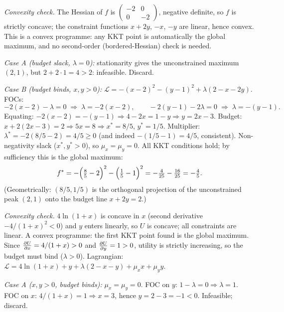 \begin{solutions}
  \item \emph{Convexity check.} The Hessian of $f$ is
        $\begin{pmatrix} -2 & 0 \\ 0 & -2 \end{pmatrix}$, negative
        definite, so $f$ is strictly concave; the constraint functions
        $x + 2y$, $-x$, $-y$ are linear, hence convex. This is a convex
        programme: any KKT point is automatically the global maximum, and
        no second-order (bordered-Hessian) check is needed.

        \emph{Case A (budget slack, $\lambda = 0$):} stationarity gives the
        unconstrained maximum $(2, 1)$, but $2 + 2 \cdot 1 = 4 > 2$:
        infeasible. Discard.

        \emph{Case B (budget binds, $x, y > 0$):}
        $\mathcal{L} = -(x - 2)^2 - (y - 1)^2 + \lambda(2 - x - 2 y)$.
        FOCs:
        \[
          -2(x - 2) - \lambda = 0
          \;\Rightarrow\; \lambda = -2(x - 2), \qquad
          -2(y - 1) - 2 \lambda = 0
          \;\Rightarrow\; \lambda = -(y - 1) .
        \]
        Equating: $-2(x - 2) = -(y - 1) \Rightarrow 4 - 2 x = 1 - y
        \Rightarrow y = 2 x - 3$. Budget:
        $x + 2(2 x - 3) = 2 \Rightarrow 5 x = 8 \Rightarrow x^* = 8/5$,
        $y^* = 1/5$. Multiplier:
        $\lambda^* = -2(8/5 - 2) = 4/5 \geq 0$ \checkmark (and indeed
        $-(1/5 - 1) = 4/5$, consistent). Non-negativity slack
        ($x^*, y^* > 0$), so $\mu_x = \mu_y = 0$. All KKT conditions hold;
        by sufficiency this is the global maximum:
        \[
          f^* = -\Bigl(\tfrac{8}{5} - 2\Bigr)^2
                - \Bigl(\tfrac{1}{5} - 1\Bigr)^2
              = -\tfrac{4}{25} - \tfrac{16}{25} = -\tfrac{4}{5} .
        \]
        (Geometrically: $(8/5, 1/5)$ is the orthogonal projection of the
        unconstrained peak $(2, 1)$ onto the budget line $x + 2y = 2$.)

  \item \emph{Convexity check.} $4 \ln(1 + x)$ is concave in $x$ (second
        derivative $-4/(1 + x)^2 < 0$) and $y$ enters linearly, so $U$ is
        concave; all constraints are linear. A convex programme: the first
        KKT point found is the global maximum. Since
        $\frac{\partial U}{\partial x} = 4/(1 + x) > 0$ and $\frac{\partial U}{\partial y} = 1 > 0$, utility is
        strictly increasing, so the budget must bind ($\lambda > 0$).
        Lagrangian:
        $\mathcal{L} = 4 \ln(1 + x) + y + \lambda(2 - x - y)
        + \mu_x x + \mu_y y$.

        \emph{Case A ($x, y > 0$, budget binds):} $\mu_x = \mu_y = 0$.
        FOC on $y$: $1 - \lambda = 0 \Rightarrow \lambda = 1$. FOC on $x$:
        $4/(1 + x) = 1 \Rightarrow x = 3$, hence $y = 2 - 3 = -1 < 0$.
        Infeasible; discard.


\end{solutions}
